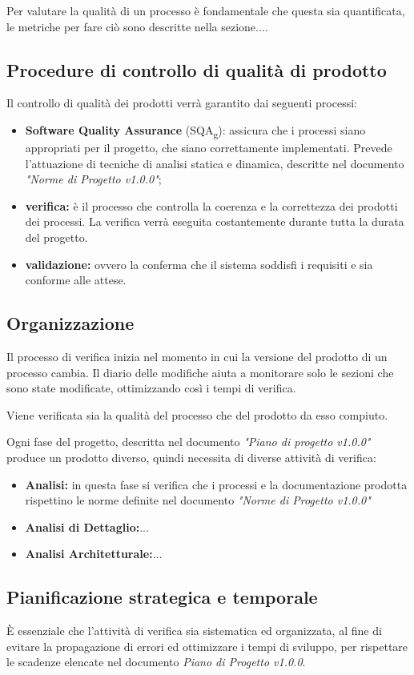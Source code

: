 \documentclass[12pt,a4paper,titlepage]{article}
\begin{document}
	Per valutare la qualità di un processo è fondamentale che questa sia quantificata, le metriche per fare ciò sono descritte nella sezione....
	
	\subsection{Procedure di controllo di qualità di prodotto}
	Il controllo di qualità dei prodotti verrà garantito dai seguenti processi:
	\begin{itemize}
		\item \textbf{Software Quality Assurance} (SQA\textsubscript{g}): assicura che i processi siano appropriati per il progetto, che siano correttamente implementati. Prevede l'attuazione di tecniche di analisi statica e dinamica, descritte nel documento \textit{"Norme di Progetto v1.0.0"};
		\item \textbf{verifica:} è il processo che controlla la coerenza e la correttezza dei prodotti dei processi. La verifica verrà eseguita costantemente durante tutta la durata del progetto.
		\item \textbf{validazione:} ovvero la conferma che il sistema soddisfi i requisiti e sia conforme alle attese.
	\end{itemize}

	\subsection{Organizzazione}
	Il processo di verifica inizia nel momento in cui la versione del prodotto di un processo cambia. Il diario delle modifiche aiuta a monitorare solo le sezioni che sono state modificate, ottimizzando così i tempi di verifica. 
	
	Viene verificata sia la qualità del processo che del prodotto da esso compiuto.
	
	Ogni fase del progetto, descritta nel documento \textit{"Piano di progetto v1.0.0"} produce un prodotto diverso, quindi necessita di diverse attività di verifica:
	\begin{itemize}
		\item \textbf{Analisi:} in questa fase si verifica che i processi e la documentazione prodotta rispettino le norme definite nel documento \textit{"Norme di Progetto v1.0.0"}
		\item \textbf{Analisi di Dettaglio:}...
		\item \textbf{Analisi Architetturale:}...
	\end{itemize}
	\subsection{Pianificazione strategica e temporale}
	È essenziale che l'attività di verifica sia sistematica ed organizzata, al fine di evitare la propagazione di errori ed ottimizzare i tempi di sviluppo, per rispettare le scadenze elencate nel documento \textit{Piano di Progetto v1.0.0}.
	
\end{document}
